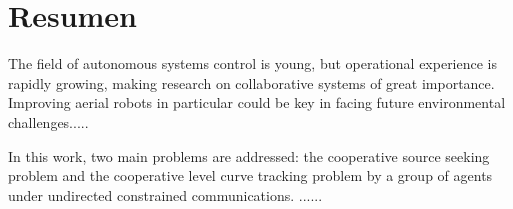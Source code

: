 \thispagestyle{plain}

\chapter*{Resumen}

The field of autonomous systems control is young, but operational experience is rapidly growing, making research on collaborative systems of great importance. Improving aerial robots in particular could be key in facing future environmental challenges.....

 In this work, two main problems are addressed: the cooperative source seeking problem and the cooperative level curve tracking problem by a group of agents under undirected constrained communications. ......